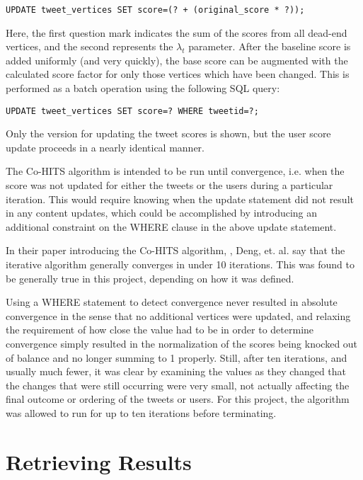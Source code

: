 \begin{verbatim}
UPDATE tweet_vertices SET score=(? + (original_score * ?));
\end{verbatim}

\noindent
Here, the first question mark indicates the sum of the scores from all dead-end vertices, and the second represents the $\lambda_{t}$ parameter. After the baseline score is added uniformly (and very quickly), the base score can be augmented with the calculated score factor for only those vertices which have been changed. This is performed as a batch operation using the following SQL query:

\begin{verbatim}
UPDATE tweet_vertices SET score=? WHERE tweetid=?;
\end{verbatim}

\noindent
Only the version for updating the tweet scores is shown, but the user score update proceeds in a nearly identical manner.

The Co-HITS algorithm is intended to be run until convergence, i.e. when the score was not updated for either the tweets or the users during a particular iteration. This would require knowing when the update statement did not result in any content updates, which could be accomplished by introducing an additional constraint on the WHERE clause in the above update statement.

In their paper introducing the Co-HITS algorithm, \cite{Deng2009}, Deng, et. al. say that the iterative algorithm generally converges in under 10 iterations. This was found to be generally true in this project, depending on how it was defined. 

Using a WHERE statement to detect convergence never resulted in absolute convergence in the sense that no additional vertices were updated, and relaxing the requirement of how close the value had to be in order to determine convergence simply resulted in the normalization of the scores being knocked out of balance and no longer summing to 1 properly. Still, after ten iterations, and usually much fewer, it was clear by examining the values as they changed that the changes that were still occurring were very small, not actually affecting the final outcome or ordering of the tweets or users. For this project, the algorithm was allowed to run for up to ten iterations before terminating.


\section{Retrieving Results}
\label{sec:RetrievingResults}

